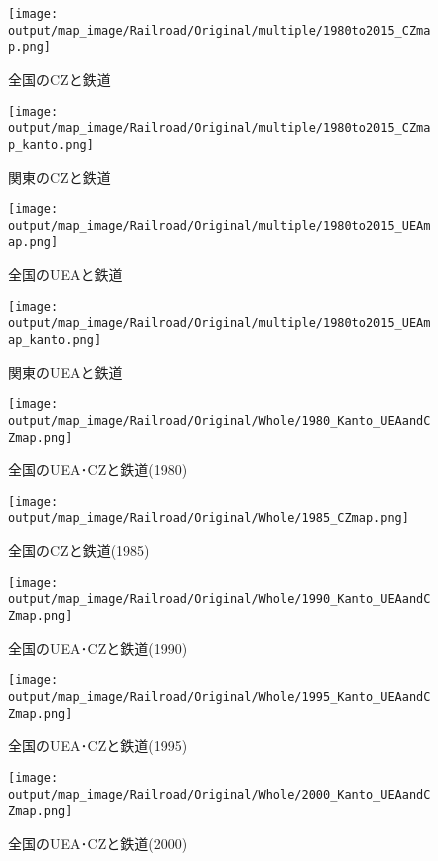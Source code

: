 \documentclass{ltjsarticle}
\begin{document}
\begin{figure}[pbth]
  \centering
  \texttt{[image: output/map\_image/Railroad/Original/multiple/1980to2015\_CZmap.png]}
  \caption{\label{allCZandRail}全国のCZと鉄道}
\end{figure}

\begin{figure}[pbth]
  \centering
  \texttt{[image: output/map\_image/Railroad/Original/multiple/1980to2015\_CZmap\_kanto.png]}
  \caption{\label{KanCZandRail}関東のCZと鉄道}
\end{figure}


\begin{figure}[pbth]
  \centering
  \texttt{[image: output/map\_image/Railroad/Original/multiple/1980to2015\_UEAmap.png]}
  \caption{\label{allUEAandRail}全国のUEAと鉄道}
\end{figure}


\begin{figure}[pbth]
  \centering
  \texttt{[image: output/map\_image/Railroad/Original/multiple/1980to2015\_UEAmap\_kanto.png]}
  \caption{\label{KanUEAandRail}関東のUEAと鉄道}
\end{figure}


\begin{figure}[pbth]
  \centering
  \texttt{[image: output/map\_image/Railroad/Original/Whole/1980\_Kanto\_UEAandCZmap.png]}
  \caption{\label{1980:allCZandUEA}全国のUEA･CZと鉄道(1980)}
\end{figure}


\begin{figure}[pbth]
  \centering
  \texttt{[image: output/map\_image/Railroad/Original/Whole/1985\_CZmap.png]}
  \caption{\label{1985:allCZandUEA}全国のCZと鉄道(1985)}
\end{figure}


\begin{figure}[pbth]
  \centering
  \texttt{[image: output/map\_image/Railroad/Original/Whole/1990\_Kanto\_UEAandCZmap.png]}
  \caption{\label{1990:allCZandUEA}全国のUEA･CZと鉄道(1990)}
\end{figure}


\begin{figure}[pbth]
  \centering
  \texttt{[image: output/map\_image/Railroad/Original/Whole/1995\_Kanto\_UEAandCZmap.png]}
  \caption{\label{1995:allCZandUEA}全国のUEA･CZと鉄道(1995)}
\end{figure}


\begin{figure}[pbth]
  \centering
  \texttt{[image: output/map\_image/Railroad/Original/Whole/2000\_Kanto\_UEAandCZmap.png]}
  \caption{\label{2000:allCZandUEA}全国のUEA･CZと鉄道(2000)}
\end{figure}
\end{document}
